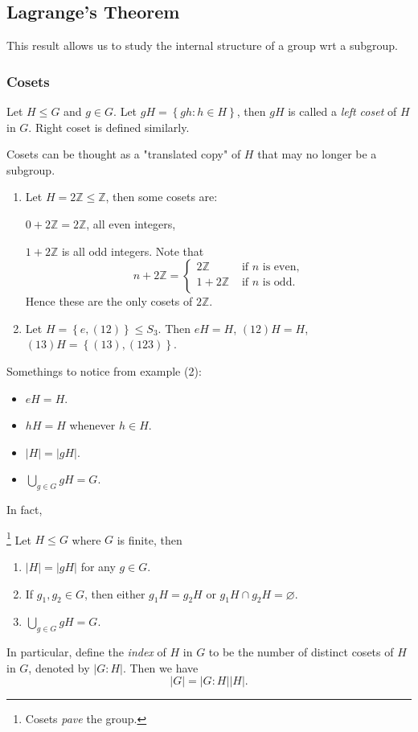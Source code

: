 \documentclass[a4paper]{article}
\begin{document}
\subsection{Lagrange's Theorem}
This result allows us to study the internal structure of a group wrt a subgroup.
\subsubsection{Cosets}
\begin{definition}
  Let $H\le G$ and $g\in G$. Let $ gH=\left\{ gh:h\in H\right\} $,
  then $gH$ is called a \textit{left coset} of $H$ in $G$. Right
  coset is defined similarly.
\end{definition}
Cosets can be thought as a "translated copy" of $H$ that may no
longer be a subgroup.
\begin{example}
  \begin{enumerate}[(1)]
    \item Let $ H=2 \mathbb{Z} \le \mathbb{Z} $, then some cosets are:

      $0+2\mathbb{Z}=2 \mathbb{Z}$, all even integers,

      $ 1+2 \mathbb{Z} $ is all odd integers. Note that
      \[
        n+  2 \mathbb{Z} =
        \begin{cases}
          2\mathbb{Z} &\text{ if $n$ is even,}\\
          1+2\mathbb{Z} &\text{ if $n$ is odd.}\\
        \end{cases}
      \]
      Hence these are the only cosets of $2 \mathbb{Z}$.
    \item Let $ H=\left\{ e,(12)\right\}\le S_3 $. Then $eH=H$, $
      (12)H=H $, $ (13)H=\left\{ (13),(123)\right\} $.
  \end{enumerate}
\end{example}
Somethings to notice from example (2):
\begin{itemize}
  \item $eH=H$.
  \item $hH=H$ whenever $h\in H$.
  \item $|H|=|gH|$.
  \item $\displaystyle \bigcup_{g\in G}gH=G$.
\end{itemize}
In fact,
\begin{theorem}[Lagrange]\label{thm:Lagrange}\footnote{Cosets
  \textit{pave} the group.}
  Let $ H \le G $ where $G$ is finite, then
  \begin{enumerate}
    \item $ |H|=|gH| $ for any $ g\in G $.
    \item If $ g_1,g_2\in G $, then either $ g_1H=g_2H $ or $ g_1H
      \cap g_2 H=\varnothing  $.
    \item $ \displaystyle \bigcup_{g\in G}gH=G $.
  \end{enumerate}
  In particular, define the \textit{index} of $H$ in $G$ to be the
  number of distinct cosets of $H$ in $G$, denoted by $ |G:H| $. Then we have
  \[
    |G|=|G:H||H|
  .\]
\end{theorem}
\end{document}
